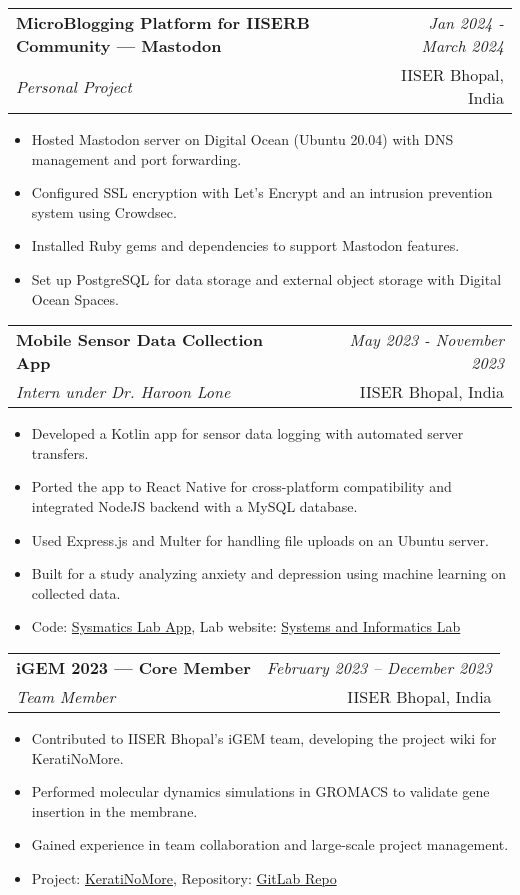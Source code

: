 \documentclass[a4paper,11pt]{article}
\makeatletter
\newcommand{\resumeSubheading}[4]{
\vspace{0.5mm}\item
    \begin{tabular*}{0.98\textwidth}[t]{l@{\extracolsep{\fill}}r}
        \textbf{#1} & \textit{\footnotesize{#4}} \\
        \textit{\footnotesize{#3}} &  \footnotesize{#2}\\
    \end{tabular*}
    \vspace{-2.4mm}
}
\newcommand{\resumeItemListStart}{\begin{itemize}[leftmargin=*,labelsep=1mm,itemsep=0.2mm]}
\newcommand{\resumeItemListEnd}{\end{itemize}\vspace{-2mm}}
\makeatother
\begin{document}
\resumeSubheading
    {MicroBlogging Platform for IISERB Community — Mastodon}{IISER Bhopal, India}
    {Personal Project}{Jan 2024 - March 2024}
    \resumeItemListStart
    \item Hosted Mastodon server on Digital Ocean (Ubuntu 20.04) with DNS management and port forwarding.
    \item Configured SSL encryption with Let's Encrypt and an intrusion prevention system using Crowdsec.
    \item Installed Ruby gems and dependencies to support Mastodon features.
    \item Set up PostgreSQL for data storage and external object storage with Digital Ocean Spaces.
    \resumeItemListEnd
\resumeSubheading
    {Mobile Sensor Data Collection App}{IISER Bhopal, India}
    {Intern under Dr. Haroon Lone}{May 2023 - November 2023}
    \resumeItemListStart
    \item Developed a Kotlin app for sensor data logging with automated server transfers.
    \item Ported the app to React Native for cross-platform compatibility and integrated NodeJS backend with a MySQL database.
    \item Used Express.js and Multer for handling file uploads on an Ubuntu server.
    \item Built for a study analyzing anxiety and depression using machine learning on collected data.
    \item Code: \href{https://github.com/kartikmandar/SysmaticsLab}{Sysmatics Lab App}, Lab website: \href{https://sites.google.com/iiserb.ac.in/sirl}{Systems and Informatics Lab}
    \resumeItemListEnd




\resumeSubheading
    {iGEM 2023 — Core Member}{IISER Bhopal, India}
    {Team Member}{February 2023 -- December 2023}
    \resumeItemListStart
    \item Contributed to IISER Bhopal's iGEM team, developing the project wiki for KeratiNoMore.
    \item Performed molecular dynamics simulations in GROMACS to validate gene insertion in the membrane.
    \item Gained experience in team collaboration and large-scale project management.
    \item Project: \href{https://2023.igem.wiki/iiser-bhopal/description}{KeratiNoMore}, Repository: \href{https://gitlab.igem.org/2023/iiser-bhopal}{GitLab Repo}
    \resumeItemListEnd
\end{document}
